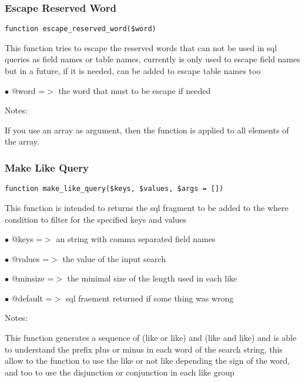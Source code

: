 \documentclass[a4paper]{article}
\begin{document}
\hypertarget{toc228}{}
\subsubsection{Escape Reserved Word}

\begin{lstlisting}
function escape_reserved_word($word)
\end{lstlisting}

This function tries to escape the reserved words that can not be used
in sql queries as field names or table names, currently is only used
to escape field names but in a future, if it is needed, can be added
to escape table names too

\begin{compactitem}
\item[\color{myblue}$\bullet$] @word =$>$ the word that must to be escape if needed
\end{compactitem}

Notes:

If you use an array as argument, then the function is applied to all
elements of the array.

\hypertarget{toc229}{}
\subsubsection{Make Like Query}

\begin{lstlisting}
function make_like_query($keys, $values, $args = [])
\end{lstlisting}

This function is intended to returns the sql fragment to be added to
the where condition to filter for the specified keys and values

\begin{compactitem}
\item[\color{myblue}$\bullet$] @keys    =$>$ an string with comma separated field names
\item[\color{myblue}$\bullet$] @values  =$>$ the value of the input search
\item[\color{myblue}$\bullet$] @minsize =$>$ the minimal size of the length used in each like
\item[\color{myblue}$\bullet$] @default =$>$ sql fraement returned if some thing was wrong
\end{compactitem}

Notes:

This function generates a sequence of (like or like) and (like and like)
and is able to understand the prefix plus or minus in each word of the
search string, this allow to the function to use the like or not like
depending the sign of the word, and too to use the disjunction or
conjunction in each like group
\end{document}
